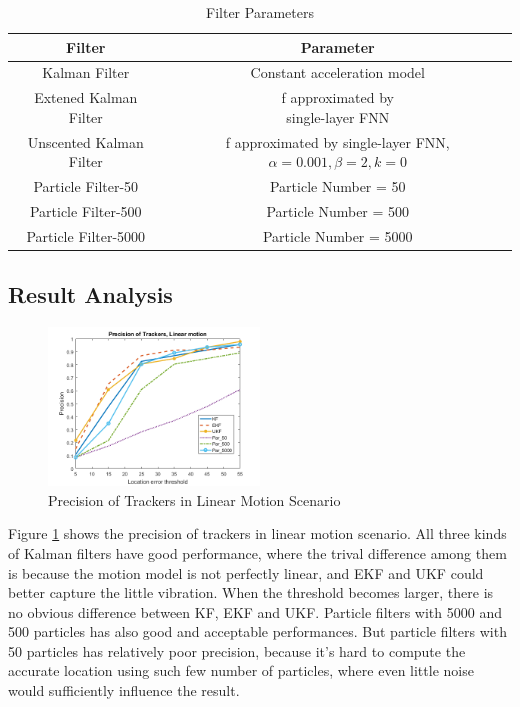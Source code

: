 \documentclass[10pt,twocolumn,letterpaper]{article}
\begin{document}
\begin{table}[h!]
  \centering
  \caption{Filter Parameters}
  \label{tab:table2}
  \begin{tabular}{|c|c|}
    \toprule
    \textbf{Filter} & \textbf{Parameter}  \\ \hline
    \midrule
    Kalman Filter & Constant acceleration model  \\ \hline
    Extened Kalman Filter & \pbox{20cm}{f approximated by\\single-layer FNN}  \\ \hline
    Unscented Kalman Filter & \pbox{20cm}{f approximated by single-layer \\FNN, $\alpha = 0.001, \beta=2, k=0$}\\ \hline
    Particle Filter-50 & Particle Number = 50  \\ \hline 
    Particle Filter-500 & Particle Number = 500  \\ \hline 
    Particle Filter-5000 & Particle Number = 5000  \\ 
    \bottomrule
  \end{tabular}
\end{table}

\subsection{Result Analysis}

\begin{figure}[h]
     \centering
       \includegraphics[width=0.5\textwidth]{Linear.png}
        \caption{\small{Precision of Trackers in Linear Motion Scenario}}
        \label{fig: linear}
 \end{figure}
 
Figure \ref{fig: linear} shows the precision of trackers in linear motion scenario. All three kinds of Kalman filters have good performance, where the trival difference among them is because the motion model is not perfectly linear, and EKF and UKF could better capture the little vibration. When the threshold becomes larger, there is no obvious difference between KF, EKF and UKF. Particle filters with 5000 and 500 particles has also good and acceptable performances. But particle filters with 50 particles has relatively poor precision, because it's hard to compute the accurate location using such few number of particles, where even little noise would sufficiently influence the result.
\end{document}
